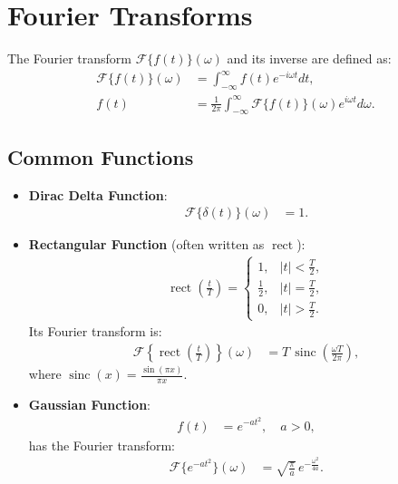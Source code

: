\documentclass[11pt]{article}
\begin{document}
\section{Fourier Transforms}
The Fourier transform \( \mathcal{F}\{f(t)\}(\omega) \) and its inverse are defined as:
\begin{align}
    \mathcal{F}\{f(t)\}(\omega) &= \int_{-\infty}^{\infty} f(t)e^{-i\omega t}dt, \\
    f(t) &= \frac{1}{2\pi}\int_{-\infty}^{\infty} \mathcal{F}\{f(t)\}(\omega)e^{i\omega t}d\omega.
\end{align}

\subsection{Common Functions}
\begin{itemize}[leftmargin=*, label={--}]
    \item \textbf{Dirac Delta Function}:
    \begin{align}
        \mathcal{F}\{\delta(t)\}(\omega) &= 1.
    \end{align}
    
    \item \textbf{Rectangular Function} (often written as \(\operatorname{rect}\)):
    \begin{align}
        \operatorname{rect}\left(\frac{t}{T}\right) =
        \begin{cases}
            1, & |t| < \frac{T}{2}, \\
            \frac{1}{2}, & |t| = \frac{T}{2}, \\
            0, & |t| > \frac{T}{2}.
        \end{cases}
    \end{align}
    Its Fourier transform is:
    \begin{align}
        \mathcal{F}\left\{\operatorname{rect}\left(\frac{t}{T}\right)\right\}(\omega)
        &= T\, \operatorname{sinc}\left(\frac{\omega T}{2\pi}\right),
    \end{align}
    where \(\operatorname{sinc}(x) = \frac{\sin(\pi x)}{\pi x}\).

    \item \textbf{Gaussian Function}:
    \begin{align}
        f(t) &= e^{-at^2}, \quad a>0,
    \end{align}
    has the Fourier transform:
    \begin{align}
        \mathcal{F}\{e^{-at^2}\}(\omega)
        &= \sqrt{\frac{\pi}{a}}\, e^{-\frac{\omega^2}{4a}}.
    \end{align}
\end{itemize}
\end{document}
